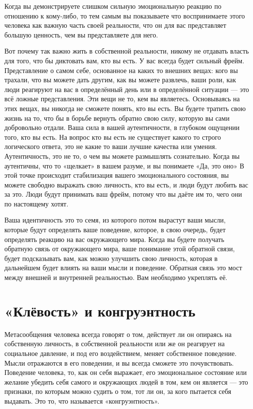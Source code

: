 Когда вы демонстрируете слишком сильную эмоциональную реакцию по отношению к кому-либо, то тем самым вы показываете что воспринимаете этого человека как важную часть своей реальности, что он для вас представляет большую ценность, чем вы представляете для него.

Вот почему так важно жить в собственной реальности, никому не отдавать власть для того, что бы диктовать вам, кто вы есть. У вас всегда будет сильный фрейм. Представление о самом себе, основанное на каких то внешних вещах: кого вы трахали, что вы можете дать другим, как вы можете развлечь, ваши роли, как люди реагируют на вас в определённый день или в определённой ситуации --- это всё ложные представления. Эти вещи не то, кем вы являетесь. Основываясь на этих вещах, вы никогда не сможете понять, кто вы есть. Вы будете тратить свою жизнь на то, что бы в борьбе вернуть обратно свою силу, которую вы сами добровольно отдали. Ваша сила в вашей аутентичности, в глубоком ощущении того, кто вы есть. На вопрос кто вы есть не существует какого то строго логического ответа, это не какие то ваши лучшие качества или умения. Аутентичность, это не то, о чем вы можете размышлять сознательно. Когда вы аутентичны, что то «щелкает» в вашем разуме, и вы понимаете «Да, это оно» В этой точке происходит стабилизация вашего эмоционального состояния, вы можете свободно выражать свою личность, кто вы есть, и люди будут любить вас за это. Люди будут принимать ваш фрейм, потому что вы даёте им то, чего они по настоящему хотят.

Ваша идентичность это то семя, из которого потом вырастут ваши мысли, которые будут определять ваше поведение, которое, в свою очередь, будет определять реакцию на вас окружающего мира. Когда вы будете получать обратную связь от окружающего мира, ваше понимание этой обратной связи, будет подсказывать вам, как можно улучшить свою личность, которая в дальнейшем будет влиять на ваши мысли и поведение. Обратная связь это мост между внешней и внутренней реальностью. Вам необходимо укреплять её.
\chapter{«Клёвость» и конгруэнтность}

Метасообщения человека всегда говорят о том, действует ли он опираясь на собственную личность, в собственной реальности или же он реагирует на социальное давление, и под его воздействием, меняет собственное поведение. Мысли отражаются в его поведении, и вы всегда сможете это почувствовать. Поведение человека, то, как он себя выражает, его эмоциональное состояние или желание убедить себя самого и окружающих людей в том, кем он является --- это признаки, по которым можно судить о том, тот ли он, за кого пытается себя выдавать. Это то, что называется «конгруэнтность».

